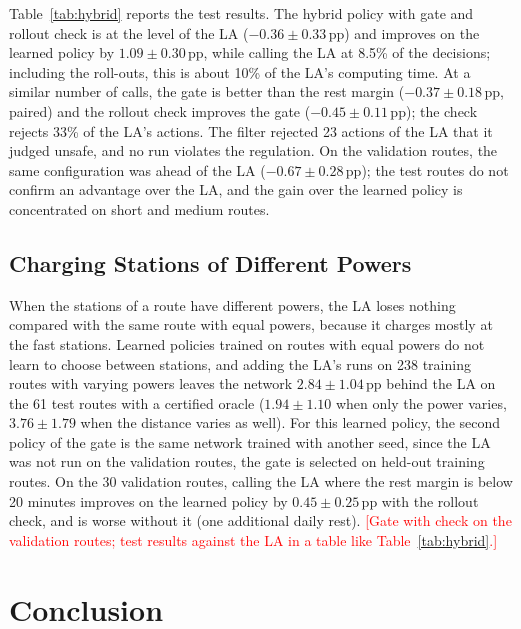 \documentclass[runningheads]{llncs}
\newcommand{\tbd}[1]{\textcolor{red}{[#1]}}
\begin{document}
Table~\ref{tab:hybrid} reports the test results. The hybrid policy with gate
and rollout check is at the level of the LA ($-0.36\pm0.33$\,pp) and improves
on the learned policy by $1.09\pm0.30$\,pp, while calling the LA at 8.5\% of
the decisions; including the roll-outs, this is about 10\% of the LA's
computing time. At a similar number of calls, the gate is better than the rest
margin ($-0.37\pm0.18$\,pp, paired) and the rollout check improves the gate
($-0.45\pm0.11$\,pp); the check rejects 33\% of the LA's actions. The filter
rejected 23 actions of the LA that it judged unsafe, and no run violates the
regulation. On the validation routes, the same configuration was ahead of the
LA ($-0.67\pm0.28$\,pp); the test routes do not confirm an advantage over the
LA, and the gain over the learned policy is concentrated on short and medium
routes.

\subsection{Charging Stations of Different Powers}
\label{sec:mixed}

When the stations of a route have different powers, the LA loses nothing
compared with the same route with equal powers, because it charges mostly at
the fast stations. Learned policies trained on routes with equal powers do not
learn to choose between stations, and adding the LA's runs on 238 training
routes with varying powers leaves the network $2.84\pm1.04$\,pp behind the LA
on the 61 test routes with a certified oracle ($1.94\pm1.10$ when only the
power varies, $3.76\pm1.79$ when the distance varies as well). For this
learned policy, the second policy of the gate is the same network trained with
another seed, since the LA was not run on the validation routes, the gate is
selected on held-out training routes. On the 30 validation routes, calling the
LA where the rest margin is below 20 minutes improves on the learned policy by
$0.45\pm0.25$\,pp with the rollout check, and is worse without it (one
additional daily rest). \tbd{Gate with check on the validation routes; test
results against the LA in a table like Table~\ref{tab:hybrid}.}

\section{Conclusion}
\label{sec:conclusion}
\end{document}
